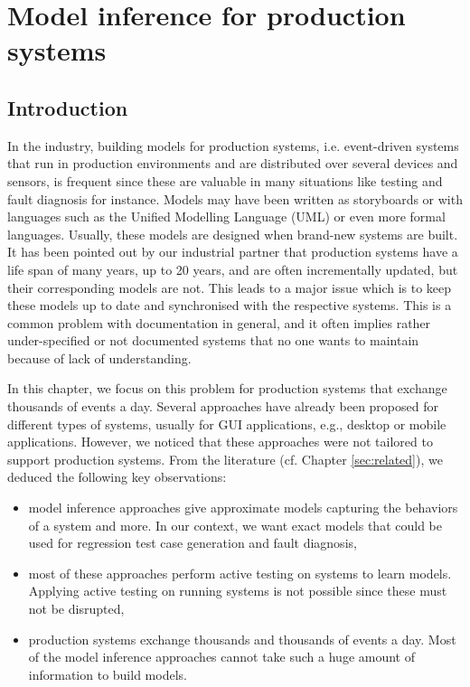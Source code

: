 \chapter{Model inference for production systems}
\label{sec:modelinf:prodsystems}

\minitoc

\section{Introduction}

In the industry, building models for production systems, i.e.
event-driven systems that run in production environments and are
distributed over several devices and sensors, is frequent since
these are valuable in many situations like testing and fault
diagnosis for instance. Models may have been written as
storyboards or with languages such as the Unified Modelling
Language (UML) or even more formal languages. Usually, these
models are designed when brand-new systems are built. It has been
pointed out by our industrial partner that production systems
have a life span of many years, up to 20 years, and are often
incrementally updated, but their corresponding models are not.
This leads to a major issue which is to keep these models up to
date and synchronised with the respective systems. This is a
common problem with documentation in general, and it often
implies rather under-specified or not documented systems that no
one wants to maintain because of lack of understanding.

In this chapter, we focus on this problem for production systems
that exchange thousands of events a day. Several approaches have
already been proposed for different types of systems, usually for
GUI applications, e.g., desktop or mobile applications. However,
we noticed that these approaches were not tailored to support
production systems. From the literature (cf. Chapter
\ref{sec:related}), we deduced the following key observations:

\begin{itemize}
    \item model inference approaches give approximate models
    capturing the behaviors of a system and more. In our
    context, we want exact models that could be used for
    regression test case generation and fault diagnosis,

    \item most of these approaches perform active testing on
    systems to learn models. Applying active testing on running
    systems is not possible since these must not be disrupted,

    \item production systems exchange thousands and thousands of
    events a day. Most of the model inference approaches cannot
    take such a huge amount of information to build models.
\end{itemize}

